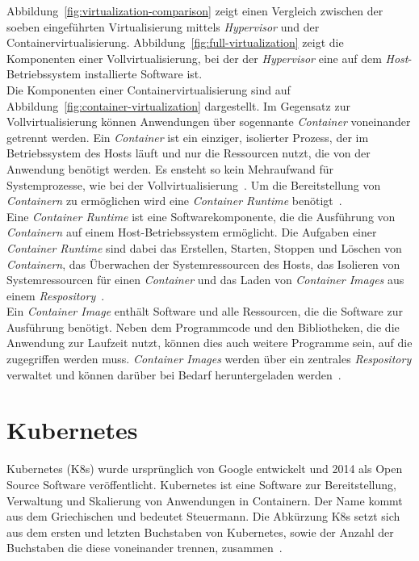 Abbildung~\ref{fig:virtualization-comparison} zeigt einen Vergleich zwischen der soeben eingeführten Virtualisierung mittels \textit{Hypervisor} und
der Containervirtualisierung.
Abbildung~\ref{fig:full-virtualization} zeigt die Komponenten einer Vollvirtualisierung, bei der der \textit{Hypervisor}
eine auf dem \textit{Host}-Betriebssystem installierte Software ist.
\\
Die Komponenten einer Containervirtualisierung sind auf Abbildung~\ref{fig:container-virtualization} dargestellt.
Im Gegensatz zur Vollvirtualisierung können Anwendungen über sogennante \textit{Container} voneinander getrennt werden.
Ein \textit{Container} ist ein einziger, isolierter Prozess, der im Betriebssystem des Hosts läuft und nur die Ressourcen nutzt, die von der Anwendung benötigt werden.
Es ensteht so kein Mehraufwand für Systemprozesse, wie bei der Vollvirtualisierung~\cite{kubernetes-in-action-introduction}.
Um die Bereitstellung von \textit{Containern} zu ermöglichen wird eine \textit{Container Runtime} benötigt~\cite{kubernetes-overview}.
\\
Eine \textit{Container Runtime} ist eine Softwarekomponente, die die Ausführung von \textit{Containern} auf einem Host-Betriebssystem ermöglicht.
Die Aufgaben einer \textit{Container Runtime} sind dabei das Erstellen, Starten, Stoppen und Löschen von \textit{Containern},
das Überwachen der Systemressourcen des Hosts, das Isolieren von Systemressourcen für einen \textit{Container}
und das Laden von \textit{Container Images} aus einem \textit{Respository}~\cite{container-runtime-aquasec}.
\\
Ein \textit{Container Image} enthält Software und alle Ressourcen, die die Software zur Ausführung benötigt.
Neben dem Programmcode und den Bibliotheken, die die Anwendung zur Laufzeit nutzt, können dies auch weitere Programme sein, auf die zugegriffen werden muss.
\textit{Container Images} werden über ein zentrales \textit{Respository} verwaltet und können darüber bei Bedarf heruntergeladen werden~\cite{container-image-dev-insider}.

\section{Kubernetes}

Kubernetes (K8s) wurde ursprünglich von Google entwickelt und 2014 als Open Source Software veröffentlicht.
Kubernetes ist eine Software zur Bereitstellung, Verwaltung und Skalierung von Anwendungen in Containern. Der Name kommt aus dem Griechischen und bedeutet Steuermann.
Die Abkürzung K8s setzt sich aus dem ersten und letzten Buchstaben von Kubernetes, sowie der Anzahl der Buchstaben die diese voneinander trennen, zusammen~\cite{kubernetes-google-cloud}.

